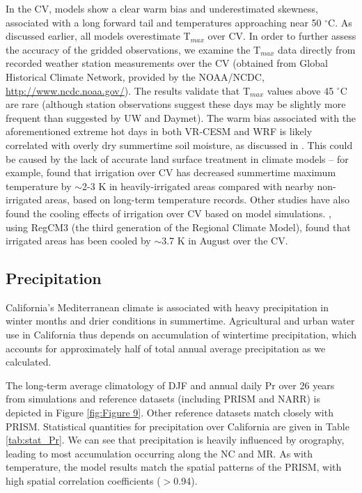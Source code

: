 In the CV, models show a clear warm bias and underestimated skewness, associated with a long forward tail and temperatures approaching near 50 $^\circ$C. As discussed earlier, all models overestimate T$_{max}$ over CV. In order to further assess the accuracy of the gridded observations, we examine the T$_{max}$ data directly from recorded weather station measurements over the CV (obtained from Global Historical Climate Network, provided by the NOAA/NCDC, \url{http://www.ncdc.noaa.gov/}). The results validate that T$_{max}$ values above 45 $^\circ$C are rare (although station observations suggest these days may be slightly more frequent than suggested by UW and Daymet). The warm bias associated with the aforementioned extreme hot days in both VR-CESM and WRF is likely correlated with overly dry summertime soil moisture, as discussed in \cite{caldwell2009evaluation}. This could be caused by the lack of accurate land surface treatment in climate models -- for example, \cite{bonfils2007empirical} found that irrigation over CV has decreased summertime maximum temperature by $\sim$2-3 K in heavily-irrigated areas compared with nearby non-irrigated areas, based on long-term temperature records. Other studies have also found the cooling effects of irrigation over CV based on model simulations. \cite{kueppers2007irrigation}, using RegCM3 (the third generation of the Regional Climate Model), found that irrigated areas has been cooled by $\sim$3.7 K in August over the CV.


\subsection{Precipitation}

California's Mediterranean climate is associated with heavy precipitation in winter months and drier conditions in summertime.  Agricultural and urban water use in California thus depends on accumulation of wintertime precipitation, which accounts for approximately half of total annual average precipitation as we calculated.

The long-term average climatology of DJF and annual daily Pr over 26 years from simulations and reference datasets (including PRISM and NARR) is depicted in Figure \ref{fig:Figure 9}. Other reference datasets match closely with PRISM. Statistical quantities for precipitation over California are given in Table \ref{tab:stat_Pr}. We can see that precipitation is heavily influenced by orography, leading to most accumulation occurring along the NC and MR. As with temperature, the model results match the spatial patterns of the PRISM, with high spatial correlation coefficients ($>$0.94).

